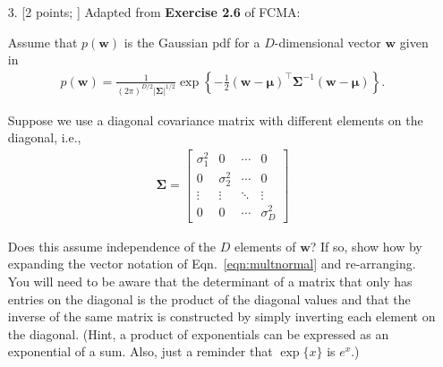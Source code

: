 \documentclass[10pt]{article}
\begin{document}
\begin{itemize}
\newpage
\item[3.] [2 points; \boldred{Required only for Graduates}]
Adapted from {\bf Exercise 2.6} of FCMA:

Assume that $p(\mathbf{w})$ is the Gaussian pdf for a $D$-dimensional vector $\mathbf{w}$ given in
\begin{eqnarray}
p(\mathbf{w}) = \frac{1}{(2 \pi)^{D/2} | \mathbf{\Sigma} |^{1/2}} \exp \left\{ -\frac{1}{2} (\mathbf{w} - \mathbf{\mu})^\top \mathbf{\Sigma}^{-1} (\mathbf{w} - \mathbf{\mu}) \right\} . \label{eqn:multnormal}
\end{eqnarray}

Suppose we use a diagonal covariance matrix with different elements on the diagonal, i.e.,
\begin{eqnarray*}
\mathbf{\Sigma} = 
\begin{bmatrix}
\sigma_1^2 & 0 & \cdots & 0 \\
0 & \sigma_2^2 & \cdots & 0 \\
\vdots & \vdots & \ddots & \vdots \\
0 & 0 & \cdots & \sigma_D^2
\end{bmatrix}
\end{eqnarray*}

Does this assume independence of the $D$ elements of $\mathbf{w}$?  If so, show how by expanding the vector notation of Eqn.~\ref{eqn:multnormal} and re-arranging.  You will need to be aware that the determinant of a matrix that only has entries on the diagonal is the product of the diagonal values and that the inverse of the same matrix is constructed by simply inverting each element on the diagonal.  (Hint, a product of exponentials can be expressed as an exponential of a sum.  Also, just a reminder that $\exp\{x\}$ is $e^x$.)


\end{itemize}
\end{document}
